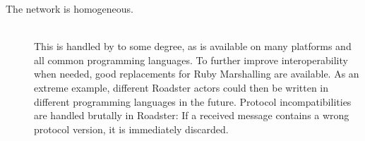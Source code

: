\begin{description}
	\item [The network is homogeneous.] \hfill\\
		This is handled by \zmq to some degree, as \zmq is available on
		many platforms and all common programming languages. To further
		improve interoperability when needed, good replacements for
		Ruby Marshalling are available. As an extreme example,
		different Roadster actors could then be written in different
		programming languages in the future. Protocol incompatibilities
		are handled brutally in Roadster: If a received message
		contains a wrong protocol version, it is immediately discarded.
\end{description}
